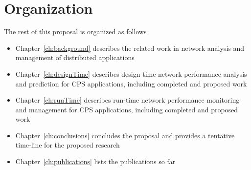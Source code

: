 \section{Organization}
\label{sec:organization}
The rest of this proposal is organized as follows
\begin{itemize}
	\item Chapter~\ref{ch:background} describes the related work in network analysis and management of distributed applications
	\item Chapter~\ref{ch:designTime} describes design-time network performance analysis and prediction for CPS applications, including completed and proposed work
	\item Chapter~\ref{ch:runTime} describes run-time network performance monitoring and management for CPS applications, including completed and proposed work
	\item Chapter~\ref{ch:conclusions} concludes the proposal and provides a tentative time-line for the proposed research
	\item Chapter~\ref{ch:publications} lists the publications so far
\end{itemize}







